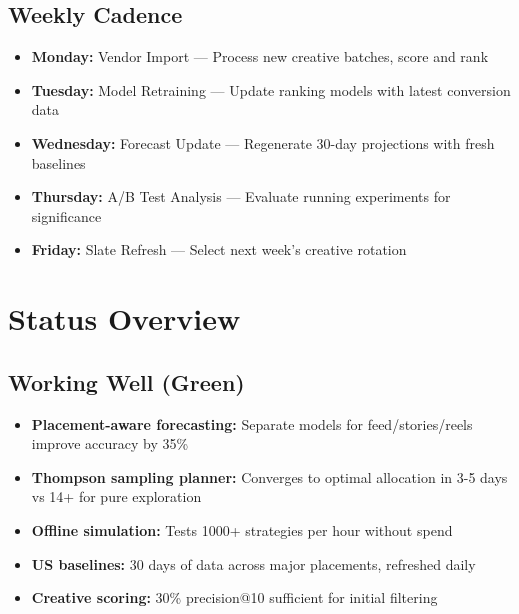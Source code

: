 \documentclass[11pt,a4paper]{report}
\newcommand{\statusgreen}[1]{\textcolor{aelpgreen}{\textbf{#1}}}
\begin{document}
\section{Weekly Cadence}

\begin{metricbox}
\begin{itemize}
    \item \textbf{Monday:} Vendor Import --- Process new creative batches, score and rank
    \item \textbf{Tuesday:} Model Retraining --- Update ranking models with latest conversion data
    \item \textbf{Wednesday:} Forecast Update --- Regenerate 30-day projections with fresh baselines
    \item \textbf{Thursday:} A/B Test Analysis --- Evaluate running experiments for significance
    \item \textbf{Friday:} Slate Refresh --- Select next week's creative rotation
\end{itemize}
\end{metricbox}

\chapter{Status Overview}

\section{\statusgreen{Working Well (Green)}}
\begin{itemize}
    \item \textbf{Placement-aware forecasting:} Separate models for feed/stories/reels improve accuracy by 35\%
    \item \textbf{Thompson sampling planner:} Converges to optimal allocation in 3-5 days vs 14+ for pure exploration
    \item \textbf{Offline simulation:} Tests 1000+ strategies per hour without spend
    \item \textbf{US baselines:} 30 days of data across major placements, refreshed daily
    \item \textbf{Creative scoring:} 30\% precision@10 sufficient for initial filtering
\end{itemize}
\end{document}
